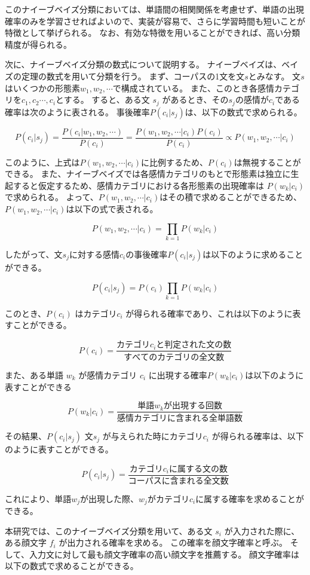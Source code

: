 \documentclass[11pt,a4j]{jsarticle}
\begin{document}
このナイーブベイズ分類においては、単語間の相関関係を考慮せず、単語の出現確率のみを学習させればよいので、実装が容易で、さらに学習時間も短いことが特徴として挙げられる。
なお、有効な特徴を用いることができれば、高い分類精度が得られる。

次に、ナイーブベイズ分類の数式について説明する。
ナイーブベイズは、ベイズの定理の数式を用いて分類を行う。
まず、コーパスの1文を文$s$とみなす。
文$s$はいくつかの形態素$w_1,w_2, \cdots $で構成されている。
また、このとき各感情カテゴリを$c_1,c_2 \cdots ,c_i$とする。
すると、ある文 $s_j$ があるとき、その$s_j$の感情が$c_i$である確率は次のように表される。
事後確率$P(c_i|s_j)$は、以下の数式で求められる。

\[
P(c_i|s_j)=\frac{P(c_i|w_1,w_2, \cdots)}{P(c_i)}=\frac{P(w_1,w_2, \cdots|c_i)P(c_i)}{P(c_i)} \propto P(w_1,w_2, \cdots|c_i)
\]

このように、上式は$P(w_1,w_2, \cdots|c_i)$に比例するため、$P(c_i)$は無視することができる。
また、ナイーブベイズでは各感情カテゴリのもとで形態素は独立に生起すると仮定するため、感情カテゴリにおける各形態素の出現確率は $P(w_k|c_i)$ で求められる。
よって、$P(w_1,w_2, \cdots |c_i)$はその積で求めることができるため、$P(w_1,w_2, \cdots |c_i)$は以下の式で表される。

\[
P(w_1,w_2, \cdots|c_i)=\prod_{k=1}P(w_k|c_i)
\]


したがって、文$s_j$に対する感情$c_i$の事後確率$P(c_i|s_j)$は以下のように求めることができる。

\[
P(c_i|s_j)=P(c_i)\prod_{k=1}P(w_k|c_i)
\]

このとき、$P(c_i)$ はカテゴリ$c_i$ が得られる確率であり、これは以下のように表すことができる。

\[
P(c_i)=\frac{カテゴリc_i と判定された文の数}{すべてのカテゴリの全文数}
\]

また、ある単語 $w_k$ が感情カテゴリ $c_i$ に出現する確率$P(w_k|c_i)$は以下のように表すことができる

\[
P(w_k|c_i)=\frac{単語 w_k が出現する回数}{感情カテゴリに含まれる全単語数}
\]

その結果、$P(c_i|s_j)$ 文$s_j$ が与えられた時にカテゴリ$c_i$ が得られる確率は、以下のように表すことができる。

\[
P(c_i|s_j)=\frac{カテゴリc_i に属する文の数}{コーパスに含まれる全文数}
\]

これにより、単語$w_j$が出現した際、$w_j$がカテゴリ$c_i$に属する確率を求めることができる。

本研究では、このナイーブベイズ分類を用いて、ある文 $s_i$ が入力された際に、ある顔文字 $f_i$ が出力される確率を求める。
この確率を顔文字確率と呼ぶ。
そして、入力文に対して最も顔文字確率の高い顔文字を推薦する。
顔文字確率は以下の数式で求めることができる。
\end{document}
